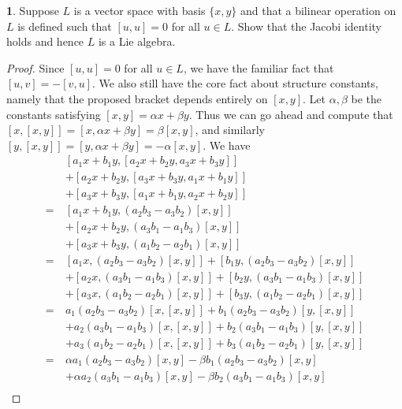 \documentclass[12pt]{article}
\theoremstyle{definition}
\newtheorem{ex}{}
\begin{document}
\begin{ex}
	Suppose $L$ is a vector space with basis $\lbrace x, y \rbrace$ and that a bilinear operation on $L$ is defined such that $[u, u] = 0$ for all $u \in L$.
	Show that the Jacobi identity holds and hence $L$ is a Lie algebra.
\end{ex}
\begin{proof}
	Since $[u, u] = 0$ for all $u \in L$, we have the familiar fact that $[u, v] = -[v, u]$.
	We also still have the core fact about structure constants, namely that the proposed bracket depends entirely on $[x, y]$.
	Let $\alpha, \beta$ be the constants satisfying $[x, y] = \alpha x + \beta y$.
	Thus we can go ahead and compute that $[x, [x, y]] = [x, \alpha x + \beta y] = \beta[x, y]$, and similarly $[y, [x, y]] = [y, \alpha x + \beta y] = -\alpha[x, y]$.
	We have \begin{align*}
		    & [a_1x + b_1y, [a_2x + b_2y, a_3x + b_3y]]                                    \\
		    & + [a_2x + b_2y, [a_3x + b_3y, a_1x + b_1y]]                                  \\
		    & + [a_3x + b_3y, [a_1x + b_1y, a_2x + b_2y]]                                  \\
		=\  & [a_1x + b_1y, (a_2b_3-a_3b_2)[x, y]]                                         \\
		    & + [a_2x + b_2y, (a_3b_1-a_1b_3)[x, y]]                                       \\
		    & + [a_3x + b_3y, (a_1b_2-a_2b_1)[x, y]]                                       \\
		=\  & [a_1x, (a_2b_3-a_3b_2)[x, y]] + [b_1y, (a_2b_3-a_3b_2)[x, y]]                \\
		    & + [a_2x, (a_3b_1-a_1b_3)[x, y]] + [b_2y, (a_3b_1-a_1b_3)[x, y]]              \\
		    & + [a_3x, (a_1b_2-a_2b_1)[x, y]] + [b_3y, (a_1b_2-a_2b_1)[x, y]]              \\
		=\  & a_1(a_2b_3-a_3b_2)[x, [x, y]] + b_1(a_2b_3-a_3b_2)[y, [x, y]]                \\
		    & + a_2(a_3b_1-a_1b_3)[x, [x, y]] + b_2(a_3b_1-a_1b_3)[y, [x, y]]              \\
		    & + a_3(a_1b_2-a_2b_1)[x, [x, y]] + b_3(a_1b_2-a_2b_1)[y, [x, y]]              \\
		=\  & \alpha a_1(a_2b_3-a_3b_2)[x, y] - \beta b_1(a_2b_3-a_3b_2)[x,y]              \\
		    & + \alpha a_2(a_3b_1-a_1b_3)[x, y] - \beta b_2(a_3b_1-a_1b_3)[x,y]            \\

\end{align*}
\end{proof}
\end{document}
